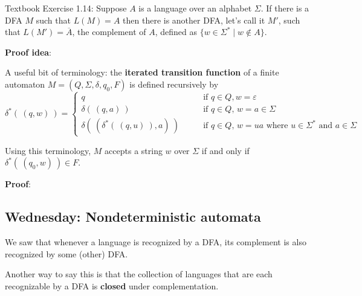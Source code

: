 \documentclass[12pt, oneside]{article}
\begin{document}
Textbook Exercise 1.14: 
Suppose $A$ is a language over an alphabet $\Sigma$. 
If there is a DFA $M$ such that $L(M) = A$ then there is another DFA, let's call it $M'$, such that 
$L(M') = \overline{A}$, the complement of $A$, defined as $\{ w \in \Sigma^* \mid w \notin A \}$.


{\bf Proof idea}:


\vfill
A useful bit of terminology: the {\bf iterated transition function} of a finite automaton
$M = (Q, \Sigma, \delta, q_0, F)$ is defined recursively by
\[
\delta^* (~(q,w)~) 
=\begin{cases}
q  \qquad &\text{if $q \in Q, w = \varepsilon$} \\
\delta( ~(q,a)~) \qquad &\text{if $q \in Q$, $w = a \in \Sigma$ } \\
\delta(~(\delta^*(~(q,u)~), a) ~) \qquad &\text{if $q \in Q$, $w = ua$ where $u \in  \Sigma^*$ and $a \in \Sigma$}
\end{cases}
\]

Using  this terminology, $M$ accepts a string $w$ over $\Sigma$ if and only if $\delta^*( ~(q_0,w)~) \in F$.


{\bf Proof}: 
\vfill


 
\newpage
\subsection*{Wednesday: Nondeterministic automata}

We saw that whenever a language is recognized by a DFA, its
complement is also recognized by some (other) DFA. 

Another way to say this is that the collection of languages
that are each recognizable by a DFA is {\bf closed} under complementation.
\end{document}
